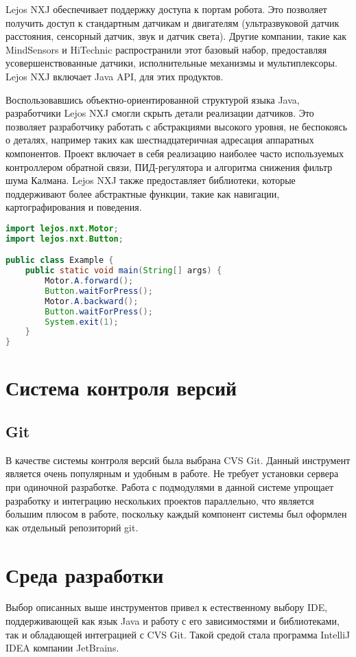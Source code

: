 Lejos NXJ обеспечивает поддержку доступа к портам робота. Это позволяет получить доступ к стандартным датчикам и двигателям (ультразвуковой датчик расстояния, сенсорный датчик, звук и датчик света). Другие компании, такие как MindSensors и HiTechnic распространили этот базовый набор, предоставляя усовершенствованные датчики, исполнительные механизмы и мультиплексоры. Lejos NXJ включает Java API, для этих продуктов.

Воспользовавшись объектно-ориентированной структурой языка Java, разработчики Lejos NXJ смогли скрыть детали реализации датчиков. Это позволяет разработчику работать с абстракциями высокого уровня, не беспокоясь о деталях, например таких как шестнадцатеричная адресация аппаратных компонентов. Проект включает в себя реализацию наиболее часто используемых контроллером обратной связи, ПИД-регулятора и алгоритма снижения фильтр шума Калмана. Lejos NXJ также предоставляет библиотеки, которые поддерживают более абстрактные функции, такие как навигации, картографирования и поведения.

\begin{lstlisting}[caption={Пример кода для работы с двигателями}, language=Java]
import lejos.nxt.Motor;
import lejos.nxt.Button;

public class Example {
    public static void main(String[] args) {
        Motor.A.forward();
        Button.waitForPress();
        Motor.A.backward();
        Button.waitForPress();
        System.exit(1);
    }
}
\end{lstlisting}


\section{Система контроля версий}
\subsection{Git}

В качестве системы контроля версий была выбрана CVS Git. Данный инструмент является очень популярным и удобным в работе. Не требует установки сервера при одиночной разработке. Работа с подмодулями в данной системе упрощает разработку и интеграцию нескольких проектов параллельно, что является большим плюсом в работе, поскольку каждый компонент системы был оформлен как отдельный репозиторий git.


\section{Среда разработки}
Выбор описанных выше инструментов привел к естественному выбору IDE, поддерживающей как язык Java и работу с его зависимостями и библиотеками, так и обладающей интеграцией с CVS Git. Такой средой стала программа IntelliJ IDEA компании JetBrains. 
